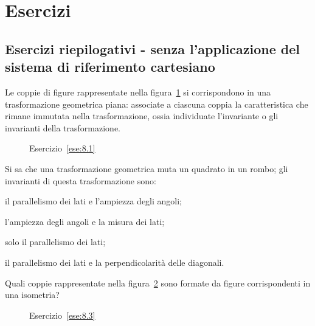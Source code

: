 
\section{Esercizi}

\subsection{Esercizi riepilogativi - senza l'applicazione del sistema di riferimento cartesiano}

\begin{esercizio}
\label{ese:8.1}
Le coppie di figure rappresentate nella figura~\ref{fig:ese8.1} si 
corrispondono in una trasformazione geometrica piana: associate a 
ciascuna coppia la caratteristica che rimane immutata nella 
trasformazione, ossia individuate l'invariante o gli invarianti della 
trasformazione.
\end{esercizio}


\begin{inaccessibleblock}
 \begin{figure}[!htb]
	\centering
	\caption{Esercizio~\ref{ese:8.1}}\label{fig:ese8.1}
\end{figure}
\end{inaccessibleblock}

\begin{esercizio}
\label{ese:8.2}
Si sa che una trasformazione geometrica muta un quadrato in un rombo; 
gli invarianti di questa trasformazione sono:
\begin{enumeratea}
\item il parallelismo dei lati e l'ampiezza degli angoli;
\item l'ampiezza degli angoli e la misura dei lati;
\item solo il parallelismo 	dei lati;
\item il parallelismo dei lati e la perpendicolarità delle diagonali.
\end{enumeratea}
\end{esercizio}

\begin{esercizio}
\label{ese:8.3}
Quali coppie rappresentate nella figura~\ref{fig:ese8.3} sono formate 
da figure corrispondenti in una isometria?
\end{esercizio}


\begin{inaccessibleblock}
 \begin{figure}[!htb]
	\centering
	\caption{Esercizio~\ref{ese:8.3}}\label{fig:ese8.3}
\end{figure}
\end{inaccessibleblock}

